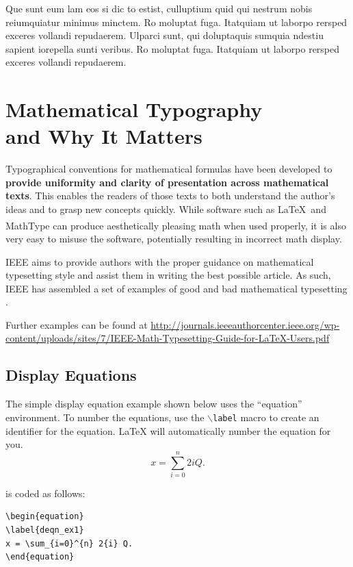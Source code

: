 \documentclass[lettersize,journal]{IEEEtran}
\begin{document}
Que sunt eum lam eos si dic to estist, culluptium quid qui nestrum nobis reiumquiatur minimus minctem. Ro moluptat fuga. Itatquiam ut laborpo rersped exceres vollandi repudaerem. Ulparci sunt, qui doluptaquis sumquia ndestiu sapient iorepella sunti veribus. Ro moluptat fuga. Itatquiam ut laborpo rersped exceres vollandi repudaerem. 
\section{Mathematical Typography \\ and Why It Matters}

Typographical conventions for mathematical formulas have been developed to {\bf provide uniformity and clarity of presentation across mathematical texts}. This enables the readers of those texts to both understand the author's ideas and to grasp new concepts quickly. While software such as \LaTeX \ and MathType\textsuperscript{\textregistered} can produce aesthetically pleasing math when used properly, it is also very easy to misuse the software, potentially resulting in incorrect math display.

IEEE aims to provide authors with the proper guidance on mathematical typesetting style and assist them in writing the best possible article. As such, IEEE has assembled a set of examples of good and bad mathematical typesetting \cite{ref1,ref2,ref3,ref4,ref5}. 

Further examples can be found at \url{http://journals.ieeeauthorcenter.ieee.org/wp-content/uploads/sites/7/IEEE-Math-Typesetting-Guide-for-LaTeX-Users.pdf}

\subsection{Display Equations}
The simple display equation example shown below uses the ``equation'' environment. To number the equations, use the $\backslash${\tt{label}} macro to create an identifier for the equation. LaTeX will automatically number the equation for you.
\begin{equation}
\label{deqn_ex1}
x = \sum_{i=0}^{n} 2{i} Q.
\end{equation}

\noindent is coded as follows:
\begin{verbatim}
\begin{equation}
\label{deqn_ex1}
x = \sum_{i=0}^{n} 2{i} Q.
\end{equation}
\end{verbatim}
\end{document}
